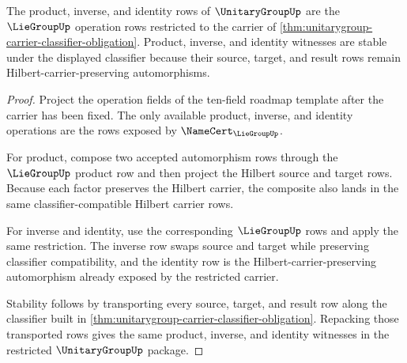 \begin{theorem}\label{thm:unitarygroup-operation-stability-obligation}
The product, inverse, and identity rows of $\UnitaryGroupUp$ are the $\LieGroupUp$ operation rows restricted to the carrier of \autoref{thm:unitarygroup-carrier-classifier-obligation}. Product, inverse, and identity witnesses are stable under the displayed classifier because their source, target, and result rows remain Hilbert-carrier-preserving automorphisms.
\end{theorem}
\begin{proof}
Project the operation fields of the ten-field roadmap template after the carrier has been fixed. The only available product, inverse, and identity operations are the rows exposed by $\NameCert_{\LieGroupUp}$.

For product, compose two accepted automorphism rows through the $\LieGroupUp$ product row and then project the Hilbert source and target rows. Because each factor preserves the Hilbert carrier, the composite also lands in the same classifier-compatible Hilbert carrier rows.

For inverse and identity, use the corresponding $\LieGroupUp$ rows and apply the same restriction. The inverse row swaps source and target while preserving classifier compatibility, and the identity row is the Hilbert-carrier-preserving automorphism already exposed by the restricted carrier.

Stability follows by transporting every source, target, and result row along the classifier built in \autoref{thm:unitarygroup-carrier-classifier-obligation}. Repacking those transported rows gives the same product, inverse, and identity witnesses in the restricted $\UnitaryGroupUp$ package.
\end{proof}

